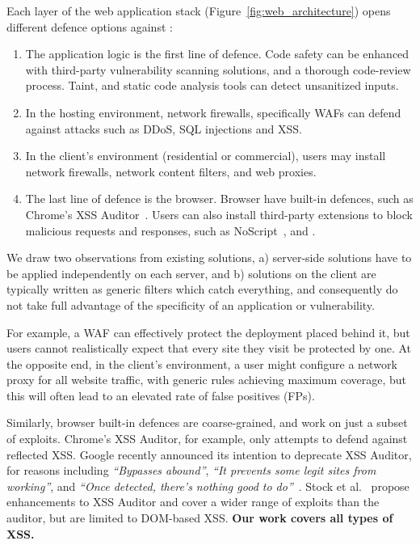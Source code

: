 Each layer of the web application stack  (Figure~\ref{fig:web_architecture}) opens different defence options against \xss:
\begin{enumerate}

\item The application logic is the first line of defence.
  Code safety can be enhanced with third-party vulnerability scanning solutions, and a thorough
  code-review process. Taint, and static code analysis tools can detect unsanitized inputs.

\item In the hosting environment, network firewalls, specifically \acp{WAF} can defend against attacks such as \ac{DDoS}, \ac{SQL} injections and \ac{XSS}.

\item In the client's environment (residential or commercial), users may install network firewalls, network content filters, and web proxies.

\item The last line of defence is the browser.
  Browser have built-in defences, such as
  Chrome's \ac{XSS} Auditor~\cite{xssauditor}. Users can also
  install third-party extensions to block malicious requests and
  responses, such as NoScript~\cite{Noscript}, and \sys.
\end{enumerate}

We draw two observations from existing solutions, a) server-side
solutions have to be applied independently on each server, and b)
solutions on the client are typically written as generic filters which
catch everything, and consequently do not take full advantage
of the specificity of an application or vulnerability.

For example, a \ac{WAF} can effectively protect the deployment placed
behind it, but users cannot realistically expect that every site they
visit be protected by one. At the opposite end, in the client's
environment, a user might configure a network proxy for all website
traffic, with generic rules achieving maximum coverage, but this
will often lead to an elevated rate of false positives (FPs).

Similarly, browser built-in defences are coarse-grained, and 
work on just a subset of exploits. Chrome's XSS Auditor, for example, only
attempts to defend against reflected \ac{XSS}. Google recently
announced its intention to deprecate XSS Auditor, for reasons
including \emph{``Bypasses abound''}, \emph{``It prevents some legit
  sites from working''}, and \emph{``Once detected, there's nothing
  good to do''}~\cite{deprecatexssauditor}. Stock et
al.~\cite{precise_dom_xss} propose enhancements to XSS Auditor and
cover a wider range of exploits than the auditor, but are limited to
DOM-based \ac{XSS}.  \textbf{Our work covers all types of \ac{XSS}.}

